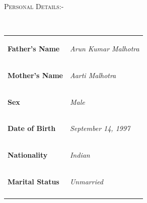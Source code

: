 \documentclass[11pt]{article}
\begin{document}
\begin{figure}[ht]
\flushleft
\noindent\colorbox{WeakOrange}
{\parbox{\dimexpr\textwidth-2\fboxsep\relax}{\textsc{Personal Details:-}}}\\
\vspace{5mm}
\begin{tabular}{ |m{5.5cm} m{14cm}| }
\hline
\rowcolor{FaintOrange}
\begin{flushleft}

\textbf{{ Father's Name }}

\end{flushleft}&\begin{center}\textit{ Arun Kumar Malhotra }\end{center}\\

\begin{flushleft}
\textbf{{ Mother's Name }}

\end{flushleft}&\begin{center}\textit{ Aarti Malhotra }\end{center}\\
\rowcolor{FaintOrange}
\begin{flushleft}

\textbf{{ Sex }}

\end{flushleft}&\begin{center}\textit{ Male }\end{center}\\
\begin{flushleft}
\textbf{{ Date of Birth }}

\end{flushleft}&\begin{center}\textit{ September 14, 1997 }\end{center}\\
\rowcolor{FaintOrange}
\begin{flushleft}

\textbf{{ Nationality }}

\end{flushleft}&\begin{center}\textit{ Indian }\end{center}\\
\begin{flushleft}
\textbf{{ Marital Status }}

\end{flushleft}&\begin{center}\textit{ Unmarried }\end{center}\\
\rowcolor{FaintOrange}
\begin{flushleft}


\end{flushleft}
\end{tabular}
\end{figure}
\end{document}
